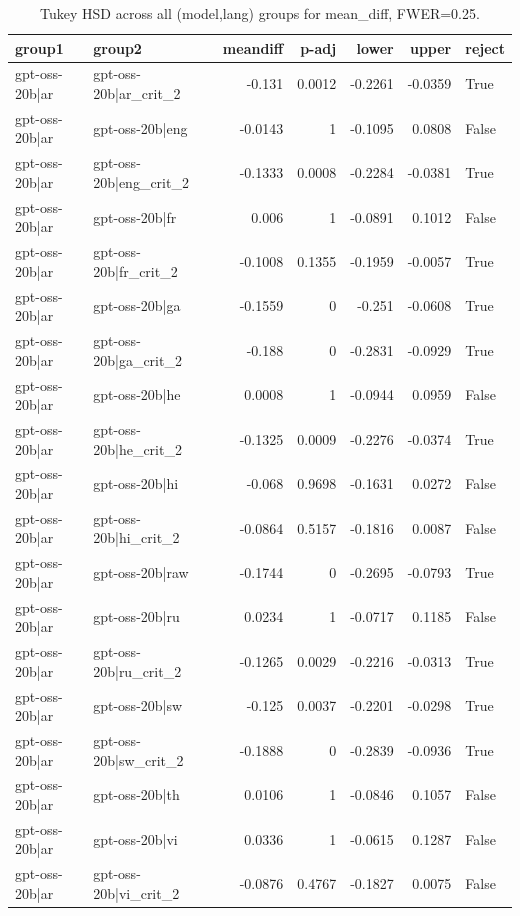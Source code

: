 \begin{table}
\caption{Tukey HSD across all (model,lang) groups for mean_diff, FWER=0.25.}
\label{tab:tukey_all_models_all_langs_mean_diff}
\begin{tabular}{l l r r r r l}
\toprule
group1 & group2 & meandiff & p-adj & lower & upper & reject \\
\midrule
gpt-oss-20b|ar & gpt-oss-20b|ar_crit_2 & -0.131 & 0.0012 & -0.2261 & -0.0359 & True \\
gpt-oss-20b|ar & gpt-oss-20b|eng & -0.0143 & 1 & -0.1095 & 0.0808 & False \\
gpt-oss-20b|ar & gpt-oss-20b|eng_crit_2 & -0.1333 & 0.0008 & -0.2284 & -0.0381 & True \\
gpt-oss-20b|ar & gpt-oss-20b|fr & 0.006 & 1 & -0.0891 & 0.1012 & False \\
gpt-oss-20b|ar & gpt-oss-20b|fr_crit_2 & -0.1008 & 0.1355 & -0.1959 & -0.0057 & True \\
gpt-oss-20b|ar & gpt-oss-20b|ga & -0.1559 & 0 & -0.251 & -0.0608 & True \\
gpt-oss-20b|ar & gpt-oss-20b|ga_crit_2 & -0.188 & 0 & -0.2831 & -0.0929 & True \\
gpt-oss-20b|ar & gpt-oss-20b|he & 0.0008 & 1 & -0.0944 & 0.0959 & False \\
gpt-oss-20b|ar & gpt-oss-20b|he_crit_2 & -0.1325 & 0.0009 & -0.2276 & -0.0374 & True \\
gpt-oss-20b|ar & gpt-oss-20b|hi & -0.068 & 0.9698 & -0.1631 & 0.0272 & False \\
gpt-oss-20b|ar & gpt-oss-20b|hi_crit_2 & -0.0864 & 0.5157 & -0.1816 & 0.0087 & False \\
gpt-oss-20b|ar & gpt-oss-20b|raw & -0.1744 & 0 & -0.2695 & -0.0793 & True \\
gpt-oss-20b|ar & gpt-oss-20b|ru & 0.0234 & 1 & -0.0717 & 0.1185 & False \\
gpt-oss-20b|ar & gpt-oss-20b|ru_crit_2 & -0.1265 & 0.0029 & -0.2216 & -0.0313 & True \\
gpt-oss-20b|ar & gpt-oss-20b|sw & -0.125 & 0.0037 & -0.2201 & -0.0298 & True \\
gpt-oss-20b|ar & gpt-oss-20b|sw_crit_2 & -0.1888 & 0 & -0.2839 & -0.0936 & True \\
gpt-oss-20b|ar & gpt-oss-20b|th & 0.0106 & 1 & -0.0846 & 0.1057 & False \\
gpt-oss-20b|ar & gpt-oss-20b|vi & 0.0336 & 1 & -0.0615 & 0.1287 & False \\
gpt-oss-20b|ar & gpt-oss-20b|vi_crit_2 & -0.0876 & 0.4767 & -0.1827 & 0.0075 & False \\

\end{tabular}
\end{table}
